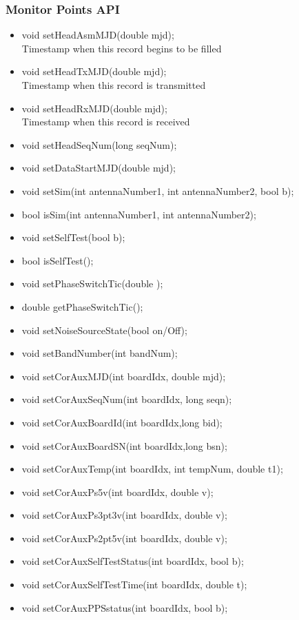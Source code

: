 \documentclass[11pt]{article}
\begin{document}
\subsubsection{Monitor Points API}
\begin{itemize}
\item    void setHeadAsmMJD(double mjd); \\
         Timestamp when this record begins to be filled
\item    void setHeadTxMJD(double mjd); \\
         Timestamp when this record is transmitted
\item    void setHeadRxMJD(double mjd); \\
         Timestamp when this record is received
\item    void setHeadSeqNum(long seqNum);
\item    void setDataStartMJD(double mjd);
\item    void setSim(int antennaNumber1, int antennaNumber2, bool b);
\item    bool isSim(int antennaNumber1, int antennaNumber2);
\item    void setSelfTest(bool b);
\item    bool isSelfTest();
\item    void setPhaseSwitchTic(double );
\item    double getPhaseSwitchTic();
\item    void setNoiseSourceState(bool on/Off);
\item    void setBandNumber(int bandNum);
\item    void setCorAuxMJD(int boardIdx, double mjd);
\item    void setCorAuxSeqNum(int boardIdx, long seqn);
\item    void setCorAuxBoardId(int boardIdx,long bid);
\item    void setCorAuxBoardSN(int boardIdx,long bsn);
\item    void setCorAuxTemp(int boardIdx, int tempNum, double t1);
\item    void setCorAuxPs5v(int boardIdx, double v);
\item    void setCorAuxPs3pt3v(int boardIdx, double v);
\item    void setCorAuxPs2pt5v(int boardIdx, double v);
\item    void setCorAuxSelfTestStatus(int boardIdx, bool b);
\item    void setCorAuxSelfTestTime(int boardIdx, double t);
\item    void setCorAuxPPSstatus(int boardIdx, bool b);

\end{itemize}
\end{document}
